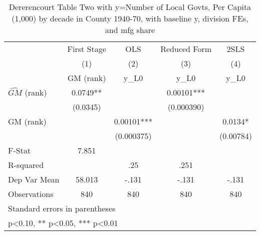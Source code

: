 \begin{table}[htbp]\centering
\def\sym#1{\ifmmode^{#1}\else\(^{#1}\)\fi}
\caption{Dererencourt Table Two with y=Number of Local Govts, Per Capita (1,000) by decade in County 1940-70, with baseline y, division FEs, and mfg share}
\begin{tabular}{l*{4}{c}}
\toprule
                    & First Stage   &         OLS   &Reduced Form   &        2SLS   \\
                    &\multicolumn{1}{c}{(1)}&\multicolumn{1}{c}{(2)}&\multicolumn{1}{c}{(3)}&\multicolumn{1}{c}{(4)}\\
                    &\multicolumn{1}{c}{GM  (rank)}&\multicolumn{1}{c}{y\_L0}&\multicolumn{1}{c}{y\_L0}&\multicolumn{1}{c}{y\_L0}\\
\midrule
$\hat{GM}$ (rank)   &      0.0749** &               &     0.00101***&               \\
                    &    (0.0345)   &               &  (0.000390)   &               \\
\addlinespace
GM  (rank)          &               &     0.00101***&               &      0.0134*  \\
                    &               &  (0.000375)   &               &   (0.00784)   \\
\midrule
F-Stat              &       7.851   &               &               &               \\
R-squared           &               &         .25   &        .251   &               \\
Dep Var Mean        &      58.013   &       -.131   &       -.131   &       -.131   \\
Observations        &         840   &         840   &         840   &         840   \\
\bottomrule
\multicolumn{5}{l}{\footnotesize Standard errors in parentheses}\\
\multicolumn{5}{l}{\footnotesize * p<0.10, ** p<0.05, *** p<0.01}\\
\end{tabular}
\end{table}
